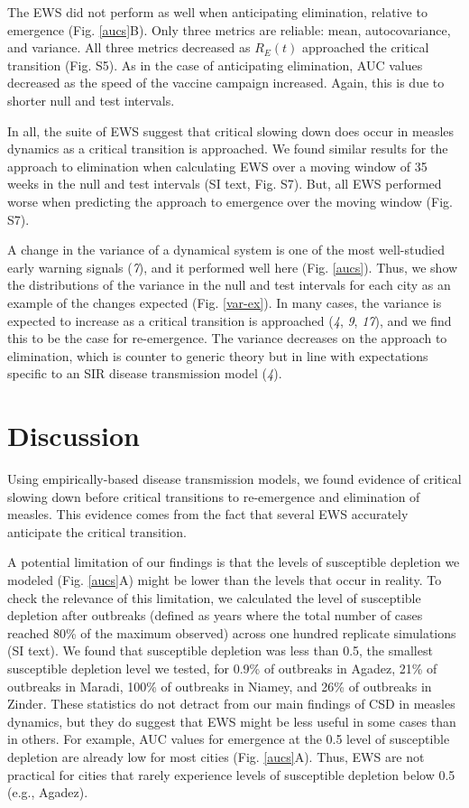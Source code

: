 \documentclass[3p]{elsarticle} %
\begin{document}
The EWS did not perform as well when anticipating elimination, relative
to emergence (Fig. \ref{aucs}B). Only three metrics are reliable: mean,
autocovariance, and variance. All three metrics decreased as \(R_E(t)\)
approached the critical transition (Fig. S5). As in the case of
anticipating elimination, AUC values decreased as the speed of the
vaccine campaign increased. Again, this is due to shorter null and test
intervals.

In all, the suite of EWS suggest that critical slowing down does occur
in measles dynamics as a critical transition is approached. We found
similar results for the approach to elimination when calculating EWS
over a moving window of 35 weeks in the null and test intervals (SI
text, Fig. S7). But, all EWS performed worse when predicting the
approach to emergence over the moving window (Fig. S7).

A change in the variance of a dynamical system is one of the most
well-studied early warning signals (\emph{7}), and it performed well
here (Fig. \ref{aucs}). Thus, we show the distributions of the variance
in the null and test intervals for each city as an example of the
changes expected (Fig. \ref{var-ex}). In many cases, the variance is
expected to increase as a critical transition is approached (\emph{4},
\emph{9}, \emph{17}), and we find this to be the case for re-emergence.
The variance decreases on the approach to elimination, which is counter
to generic theory but in line with expectations specific to an SIR
disease transmission model (\emph{4}).

\hypertarget{discussion}{%
\section{Discussion}\label{discussion}}

Using empirically-based disease transmission models, we found evidence
of critical slowing down before critical transitions to re-emergence and
elimination of measles. This evidence comes from the fact that several
EWS accurately anticipate the critical transition.

A potential limitation of our findings is that the levels of susceptible
depletion we modeled (Fig. \ref{aucs}A) might be lower than the levels
that occur in reality. To check the relevance of this limitation, we
calculated the level of susceptible depletion after outbreaks (defined
as years where the total number of cases reached 80\% of the maximum
observed) across one hundred replicate simulations (SI text). We found
that susceptible depletion was less than 0.5, the smallest susceptible
depletion level we tested, for 0.9\% of outbreaks in Agadez, 21\% of
outbreaks in Maradi, 100\% of outbreaks in Niamey, and 26\% of outbreaks
in Zinder. These statistics do not detract from our main findings of CSD
in measles dynamics, but they do suggest that EWS might be less useful
in some cases than in others. For example, AUC values for emergence at
the 0.5 level of susceptible depletion are already low for most cities
(Fig. \ref{aucs}A). Thus, EWS are not practical for cities that rarely
experience levels of susceptible depletion below 0.5 (e.g., Agadez).
\end{document}
